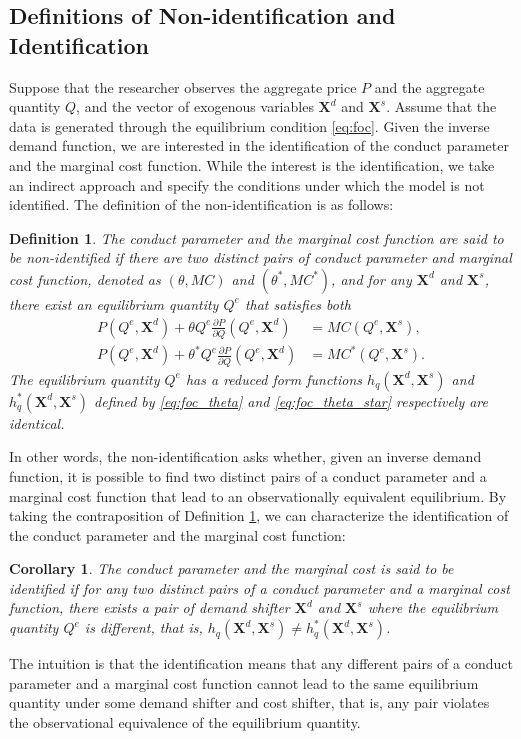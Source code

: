 \documentclass[11pt, a4paper]{article}
\newtheorem{definition}{Definition}
\newtheorem{corollary}{Corollary}
\begin{document}
\subsection{Definitions of Non-identification and Identification}\label{subsec:definition_identification}
Suppose that the researcher observes the aggregate price $P$ and the aggregate quantity $Q$, and the vector of exogenous variables $\bm{X}^{d}$ and $\bm{X}^{s}$.
Assume that the data is generated through the equilibrium condition \eqref{eq:foc}.
Given the inverse demand function, we are interested in the identification of the conduct parameter and the marginal cost function.
While the interest is the identification, we take an indirect approach and specify the conditions under which the model is not identified.
The definition of the non-identification is as follows:
\begin{definition}\label{definition:non_identification}
    The conduct parameter and the marginal cost function are said to be non-identified if there are two distinct pairs of conduct parameter and marginal cost function, denoted as $(\theta, MC)$ and $(\theta^{*}, MC^{*})$, and for any $\bm{X}^{d}$ and $\bm{X}^{s}$, there exist an equilibrium quantity $Q^e$ that satisfies both
    \begin{align}
    P(Q^e, \bm{X}^{d}) + \theta Q^e\frac{\partial P}{\partial Q}(Q^e, \bm{X}^{d}) & = MC(Q^e, \bm{X}^{s}) ,  \label{eq:foc_theta}\\
    P(Q^e, \bm{X}^{d}) + \theta^{*} Q^e\frac{\partial P}{\partial Q}(Q^e, \bm{X}^{d}) & = MC^{*}(Q^e, \bm{X}^{s}).\label{eq:foc_theta_star}
    \end{align}
    The equilibrium quantity $Q^e$ has a reduced form functions $h_q(\bm{X}^{d}, \bm{X}^{s})$ and $h_q^{*}(\bm{X}^{d}, \bm{X}^{s})$ defined by \eqref{eq:foc_theta} and \eqref{eq:foc_theta_star} respectively are identical.
\end{definition}
In other words, the non-identification asks whether, given an inverse demand function, it is possible to find two distinct pairs of a conduct parameter and a marginal cost function that lead to an observationally equivalent equilibrium.
By taking the contraposition of Definition \ref{definition:non_identification}, we can characterize the identification of the conduct parameter and the marginal cost function:
\begin{corollary}\label{corollary:identification}
    The conduct parameter and the marginal cost is said to be identified if for any two distinct pairs of a conduct parameter and a marginal cost function, there exists a pair of demand shifter $\bm{X}^{d}$ and $\bm{X}^{s}$ where the equilibrium quantity $Q^e$ is different, that is, $h_q(\bm{X}^{d}, \bm{X}^{s}) \ne h_q^{*}(\bm{X}^{d}, \bm{X}^{s})$.
\end{corollary}
The intuition is that the identification means that any different pairs of a conduct parameter and a marginal cost function cannot lead to the same equilibrium quantity under some demand shifter and cost shifter, that is, any pair violates the observational equivalence of the equilibrium quantity.
\end{document}
